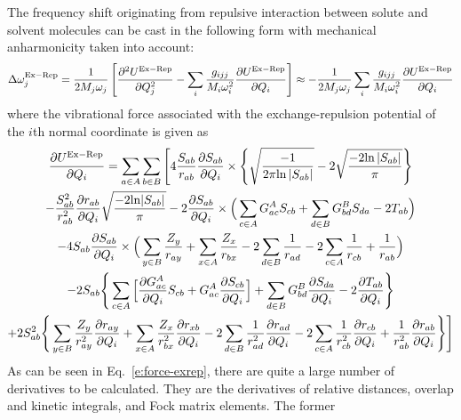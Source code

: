 \documentclass[a4paper,titlepage,twoside,fleqn,12pt]{book}
\newcommand{\fderiv}[2]{\ensuremath{
\frac{\partial #1}{\partial #2}}}
\newcommand{\sderiv}[2]{\ensuremath{
\frac{\partial^2 #1}{\partial #2^2}
}}
\begin{document}
\begin{refsection}
The frequency shift originating from repulsive interaction between 
solute and solvent molecules can be cast in the following form 
with mechanical anharmonicity taken into account: 
%
\begin{equation}\label{e:dw-exrep-base}
\Delta \omega_j^{\rm Ex-Rep} =
\frac{1}{2M_j\omega_j} \left[ 
\sderiv{U^{\rm Ex-Rep}}{Q_j} -
\sum_i \frac{g_{ijj}}{M_i\omega_i^2}\fderiv{U^{\rm Ex-Rep}}{Q_i}
\right]
\approx 
-\frac{1}{2M_j\omega_j}\sum_i \frac{g_{ijj}}{M_i\omega_i^2}\fderiv{U^{\rm Ex-Rep}}{Q_i}
\end{equation}
%
where the vibrational force associated with the exchange\hyp{}repulsion 
potential of the $i$th normal coordinate is given as
%
\begin{multline}\label{e:force-exrep}
\fderiv{U^{\rm Ex-Rep}}{Q_i} = 
\sum_{a \in A}\sum_{b \in B} 
\Bigg[ 4
   \frac{S_{ab}}{r_{ab}}
   \fderiv{S_{ab}}{Q_i}
   \times
   \Bigg\{
       \sqrt{\frac{-1}{2\pi{\rm ln}\left|S_{ab}\right|}} - 2\sqrt{\frac{-2{\rm ln}\left|S_{ab}\right|}{\pi}}
   \Bigg\} \\
   -\frac{S_{ab}^2}{r_{ab}^2}
   \fderiv{r_{ab}}{Q_i}
   \sqrt{\frac{-2{\rm ln}|S_{ab}|}{\pi}}
   - 2\fderiv{S_{ab}}{Q_i} 
   \times
   \Big( 
       \sum_{c \in A} G^A_{ac} S_{cb} + 
       \sum_{d \in B} G^B_{bd} S_{da} - 2 T_{ab} 
   \Big) \\
   -4S_{ab} \fderiv{S_{ab}}{Q_i}
   \times
   \Big( \sum_{y \in B} \frac{Z_y}{r_{ay}} 
       + \sum_{x \in A} \frac{Z_x}{r_{bx}} - 2\sum_{d \in B} \frac{1}{r_{ad}}
       - 2\sum_{c \in A} \frac{1}{r_{cb}} + \frac{1}{r_{ab}}
   \Big) \\%
   - 2S_{ab}
   \Bigg\{ 
       \sum_{c \in A} 
       \Big[
          \fderiv{G^A_{ac}}{Q_i} S_{cb}  +  G^A_{ac} \fderiv{S_{cb}}{Q_i}
       \Big] +
       \sum_{d \in B} G^B_{bd} \fderiv{S_{da}}{Q_i} - 2 \fderiv{T_{ab}}{Q_i}
   \Bigg\} \\
   + 2S^2_{ab} 
   \Bigg\{ 
      \sum_{y \in B} \frac{Z_y}{r_{ay}^2} \fderiv{r_{ay}}{Q_i} +
      \sum_{x \in A} \frac{Z_x}{r_{bx}^2} \fderiv{r_{xb}}{Q_i} -
      2\sum_{d \in B} \frac{1}{r_{ad}^2} \fderiv{r_{ad}}{Q_i} %
    - 2\sum_{c \in A} \frac{1}{r_{cb}^2} \fderiv{r_{cb}}{Q_i} + \frac{1}{r_{ab}^2} \fderiv{r_{ab}}{Q_i}
   \Bigg\}
\Bigg]
\end{multline}
%
As can be seen in Eq.~\eqref{e:force-exrep}, there are quite a large number of derivatives 
to be calculated. They are the derivatives of relative distances, 
overlap and kinetic integrals, and Fock matrix elements. The former 

\end{refsection}
\end{document}
